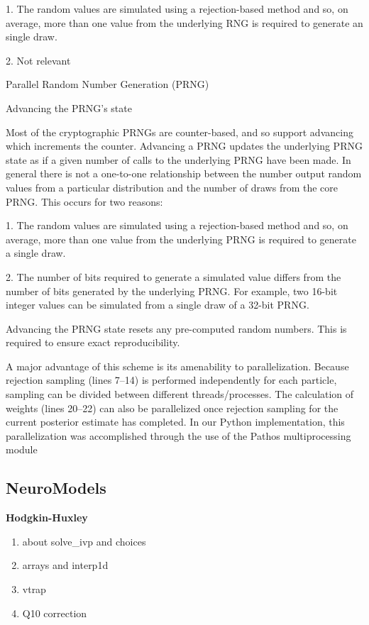1. The random values are simulated using a rejection-based method and so, on average, more than one value from the underlying RNG is required to generate an single draw.

2. Not relevant

Parallel Random Number Generation (PRNG) 

Advancing the PRNG’s state

Most of the cryptographic PRNGs are counter-based, and so support advancing which increments the counter. Advancing a PRNG updates the underlying PRNG state as if a given number of calls to the underlying PRNG have been made. In general there is not a one-to-one relationship between the number output random values from a particular distribution and the number of draws from the core PRNG. This occurs for two reasons:

1. The random values are simulated using a rejection-based method and so, on average, more than one value from the underlying PRNG is required to generate a single draw.

2. The number of bits required to generate a simulated value differs from the number of bits generated by the underlying PRNG. For example, two 16-bit integer values can be simulated from a single draw of a 32-bit PRNG.

Advancing the PRNG state resets any pre-computed random numbers. This is required to ensure exact reproducibility.

A major advantage of this scheme is its amenability to parallelization. Because rejection sampling (lines 7–14) is performed independently for each particle, sampling can be divided between different threads/processes. The calculation of weights (lines 20–22) can also be parallelized once rejection sampling for the current posterior estimate has completed. In our Python implementation, this parallelization was accomplished through the use of the Pathos multiprocessing module

\subsection{NeuroModels}

\textbf{Hodgkin-Huxley}

\begin{enumerate}
    \item about solve\_ivp and choices 
    \item arrays and interp1d
    \item vtrap 
    \item Q10 correction
\end{enumerate}

